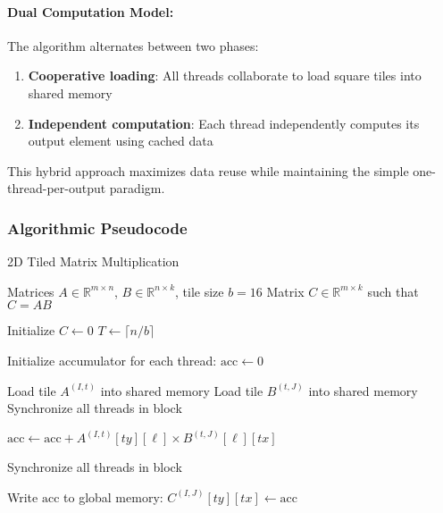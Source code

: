 \documentclass{amsbook}
\theoremstyle{definition}
\begin{document}
\paragraph{Dual Computation Model:} The algorithm alternates between two phases:
\begin{enumerate}
\item \textbf{Cooperative loading}: All threads collaborate to load square tiles into shared memory
\item \textbf{Independent computation}: Each thread independently computes its output element using cached data
\end{enumerate}

This hybrid approach maximizes data reuse while maintaining the simple one-thread-per-output paradigm.

\subsubsection{Algorithmic Pseudocode}

\begin{algorithm}
\caption{2D Tiled Matrix Multiplication}
\begin{algorithmic}[1]
\Require Matrices $A \in \mathbb{R}^{m \times n}$, $B \in \mathbb{R}^{n \times k}$, tile size $b = 16$
\Ensure Matrix $C \in \mathbb{R}^{m \times k}$ such that $C = AB$

\State Initialize $C \leftarrow 0$
\State $T \leftarrow \lceil n/b \rceil$ 

    \State Initialize accumulator for each thread: $\text{acc} \leftarrow 0$

     
        \State Load tile $A^{(I,t)}$ into shared memory 
        \State Load tile $B^{(t,J)}$ into shared memory 
        \State Synchronize all threads in block

         
            \State $\text{acc} \leftarrow \text{acc} + A^{(I,t)}[ty][\ell] \times B^{(t,J)}[\ell][tx]$
        \EndFor

        \State Synchronize all threads in block
    \EndFor

    \State Write $\text{acc}$ to global memory: $C^{(I,J)}[ty][tx] \leftarrow \text{acc}$
\EndFor
\end{algorithmic}
\end{algorithm}
\end{document}
